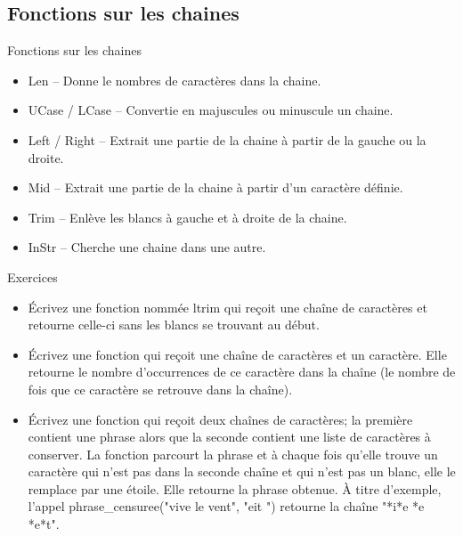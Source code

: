 \documentclass[aspectratio=169,usenames,dvipsnames]{beamer}
\begin{document}
    \subsection{Fonctions sur les chaines}
    \begin{frame}{Fonctions sur les chaines}
        \begin{itemize}
            \item \alert{Len} – Donne le nombres de caractères dans la chaine.
            \item \alert{UCase} / \alert{LCase} – Convertie en majuscules ou minuscule un chaine.
            \item \alert{Left} / \alert{Right} – Extrait une partie de la chaine à partir de la gauche ou la droite.
            \item \alert{Mid} – Extrait une partie de la chaine à partir d’un caractère définie.
            \item \alert{Trim} – Enlève les blancs à gauche et à droite de la chaine.
            \item \alert{InStr} – Cherche une chaine dans une autre.

        \end{itemize}
    \end{frame}
    \begin{frame}{Exercices}
        \begin{itemize}
            \item Écrivez une fonction nommée ltrim qui reçoit une chaîne de caractères et retourne celle-ci sans les blancs se trouvant au début.
            \item Écrivez une fonction qui reçoit une chaîne de caractères et un caractère. Elle retourne le nombre d'occurrences de ce caractère dans la chaîne (le nombre de fois que ce caractère se retrouve dans la chaîne).
            \item Écrivez une fonction qui reçoit deux chaînes de caractères; la première contient une phrase alors que la seconde contient une liste de caractères à conserver. La fonction parcourt la phrase et à chaque fois qu'elle trouve un caractère qui n'est pas dans la seconde chaîne et qui n'est pas un blanc, elle le remplace par une étoile. Elle retourne la phrase obtenue.
                    À titre d'exemple, l'appel phrase\_censuree("vive le vent", "eit ") retourne la chaîne "*i*e *e *e*t".

        \end{itemize}
    \end{frame}
\end{document}

